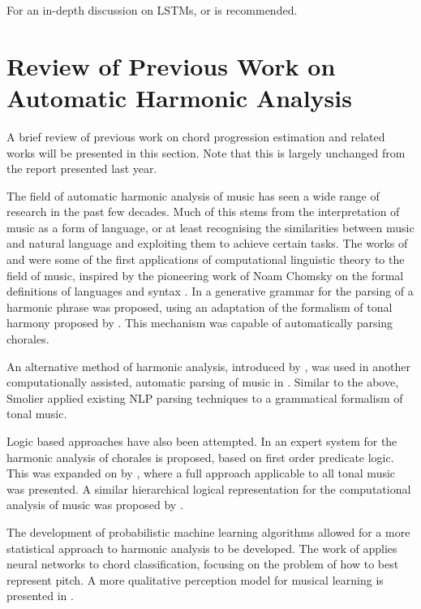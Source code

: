 \documentclass[bsc,singlespacing,logo, parskip, deptreport]{infthesis}
\begin{document}
For an in-depth discussion on LSTMs, \cite{olah_2015} or \cite{greff2016lstm} is recommended.

\section{Review of Previous Work on Automatic Harmonic Analysis}

A brief review of previous work on chord progression estimation and related works will be presented in this section. Note that this is largely unchanged from the report presented last year.

The field of automatic harmonic analysis of music has seen a wide range of research in the past few decades. Much of this stems from the interpretation of music as a form of language, or at least recognising the similarities between music and natural language and exploiting them to achieve certain tasks. The works of \cite{winograd1968linguistics} and \cite{forte1967syntax} were some of the first applications of computational linguistic theory to the field of music, inspired by the pioneering work of Noam Chomsky on the formal definitions of languages and syntax \cite{lees1957syntactic}. In \cite{winograd1968linguistics} a generative grammar for the parsing of a harmonic phrase was proposed, using an adaptation of the formalism of tonal harmony proposed by \cite{forte1962tonal}. This mechanism was capable of automatically parsing chorales.

An alternative method of harmonic analysis, introduced by \cite{schenker1979harmony}, was used in another computationally assisted, automatic parsing of music in \cite{smoliar1979computer}. Similar to the above, Smolier applied existing NLP parsing techniques to a grammatical formalism of tonal music.

Logic based approaches have also been attempted. In \cite{ebciouglu1990expert} an expert system for the harmonic analysis of chorales is proposed, based on first order predicate logic. This was expanded on by \cite{maxwell1992expert}, where a full approach applicable to all tonal music was presented. A similar hierarchical logical representation for the computational analysis of music was proposed by \cite{smaill1993hierarchical}.

The development of probabilistic machine learning algorithms allowed for a more statistical approach to harmonic analysis to be developed. The work of \cite{laden1989representation} applies neural networks to chord classification, focusing on the problem of how to best represent pitch. A more qualitative perception model for musical learning is presented in \cite{widmer1992qualitative}.
\end{document}
